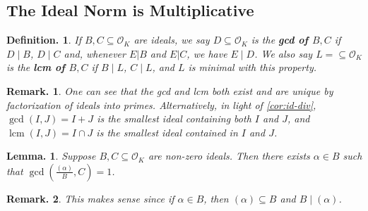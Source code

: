 \documentclass[11pt, a4paper]{memoir}
\theoremstyle{change}
\newtheorem{lemma}[theorem]{Lemma.}
\theoremstyle{plain}
\theoremstyle{nonumberplain}
\newtheorem{definition}{Definition.}
\newtheorem{remark}{Remark.}
\DeclareMathOperator{\lcm}{lcm}
\newcommand{\mbf}[1]{{\boldmath\bfseries #1}}
\numberwithin{equation}{section}
\begin{document}
\subsection{The Ideal Norm is Multiplicative}
\begin{definition}
    If $B,C\subseteq\mathcal{O}_K$ are ideals, we say $D\subseteq\mathcal{O}_K$ is the \mbf{gcd of $B,C$} if $D\mid B$, $D\mid C$ and, whenever $E|B$ and $E|C$, we have $E\mid D$.
    We also say $L=\subseteq\mathcal{O}_K$ is the \mbf{lcm of $B,C$} if $B\mid L$, $C\mid L$, and $L$ is minimal with this property.
\end{definition}
\begin{remark}
    One can see that the gcd and lcm both exist and are unique by factorization of ideals into primes.
    Alternatively, in light of \cref{cor:id-div}, $\gcd(I,J)=I+J$ is the smallest ideal containing both $I$ and $J$, and $\lcm(I,J)=I\cap J$ is the smallest ideal contained in $I$ and $J$.
\end{remark}
\begin{lemma}\label{lem:gcd-pr}
    Suppose $B,C\subseteq\mathcal{O}_K$ are non-zero ideals.
    Then there exists $\alpha\in B$ such that $\gcd\left(\frac{(\alpha)}{B},C\right)=1$.
\end{lemma}
\begin{remark}
    This makes sense since if $\alpha\in B$, then $(\alpha)\subseteq B$ and $B\mid (\alpha)$.
\end{remark}
\end{document}
